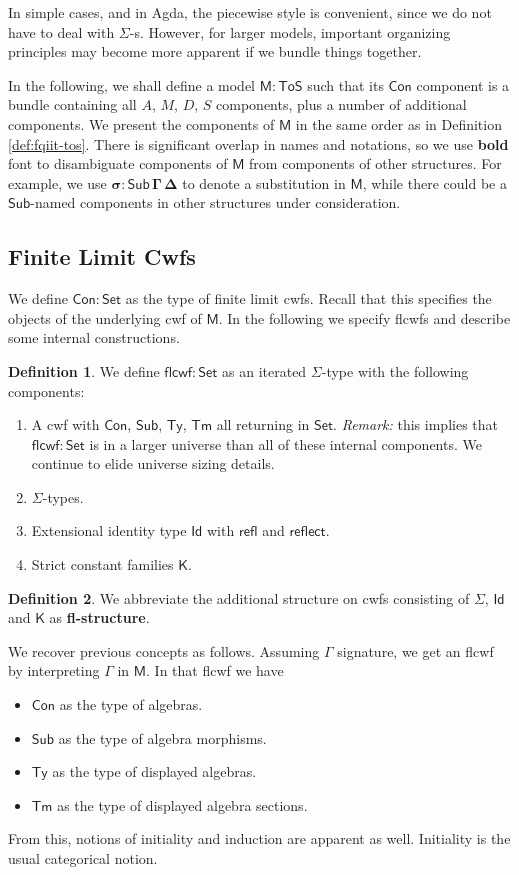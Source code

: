 \documentclass[12pt,a4paper,twoside,openany]{book}
\theoremstyle{remark}
\theoremstyle{definition}
\newtheorem{mydefinition}{Definition}
\theoremstyle{theorem}
\newcommand{\bs}[1]{\boldsymbol{#1}}
\newcommand{\refl}{\mathsf{refl}}
\newcommand{\reflect}{\mathsf{reflect}}
\newcommand{\Con}{\mathsf{Con}}
\newcommand{\Sub}{\mathsf{Sub}}
\newcommand{\Tm}{\mathsf{Tm}}
\newcommand{\Ty}{\mathsf{Ty}}
\newcommand{\Id}{\mathsf{Id}}
\newcommand{\Set}{\mathsf{Set}}
\newcommand{\ToS}{\mathsf{ToS}}
\newcommand{\flcwf}{\mathsf{flcwf}}
\newcommand{\K}{\mathsf{K}}
\newcommand{\bCon}{\bs{\Con}}
\newcommand{\bM}{\bs{\mathsf{M}}}
\begin{document}
In simple cases, and in Agda, the piecewise style is convenient, since we do not
have to deal with $\Sigma$-s. However, for larger models, important organizing
principles may become more apparent if we bundle things together.

In the following, we shall define a model $\bM : \ToS$ such that its $\Con$
component is a bundle containing all $A$, $M$, $D$, $S$ components, plus a
number of additional components. We present the components of $\bM$ in the same
order as in Definition \ref{def:fqiit-tos}. There is significant overlap in
names and notations, so we use \textbf{bold} font to disambiguate components of
$\bM$ from components of other structures. For example, we use $\bs{\sigma :
  \Sub\,\Gamma\,\Delta}$ to denote a substitution in $\bM$, while there could be
a $\Sub$-named components in other structures under consideration.

\subsection{Finite Limit Cwfs}

We define $\bCon : \Set$ as the type of finite limit cwfs. Recall that this
specifies the objects of the underlying cwf of $\bM$. In the following we
specify flcwfs and describe some internal constructions.

\begin{mydefinition}\label{def:flcwf}
We define $\flcwf : \Set$ as an iterated $\Sigma$-type with the following components:
\begin{enumerate}
  \item A cwf with $\Con$, $\Sub$, $\Ty$, $\Tm$ all returning in $\Set$. \emph{Remark:}
        this implies that $\flcwf : \Set$ is in a larger universe than all of these
        internal components. We continue to elide universe sizing details.
  \item $\Sigma$-types.
  \item Extensional identity type $\Id$ with $\refl$ and $\reflect$.
  \item Strict constant families $\K$.
\end{enumerate}
\end{mydefinition}
\begin{mydefinition}
We abbreviate the additional structure on cwfs consisting of $\Sigma$, $\Id$ and
$\K$ as \textbf{fl-structure}.
\end{mydefinition}

We recover previous concepts as follows. Assuming $\Gamma$ signature, we get an
flcwf by interpreting $\Gamma$ in $\bM$. In that flcwf we have
\begin{itemize}
  \item $\Con$ as the type of algebras.
  \item $\Sub$ as the type of algebra morphisms.
  \item $\Ty$ as the type of displayed algebras.
  \item $\Tm$ as the type of displayed algebra sections.
\end{itemize}
From this, notions of initiality and induction are apparent as well. Initiality
is the usual categorical notion.
\end{document}
